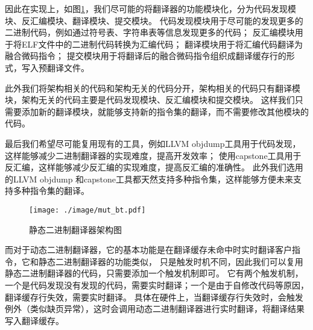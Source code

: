 因此在实现上，如图\ref{img:mut_bt}，我们尽可能的将翻译器的功能模块化，分为代码发现模块、反汇编模块、翻译模块、提交模块。
代码发现模块用于尽可能的发现更多的二进制代码，例如通过符号表、字符串表等信息发现更多的代码；
反汇编模块用于将ELF文件中的二进制代码转换为汇编代码；
翻译模块用于将汇编代码翻译为融合微码指令；
提交模块用于将翻译后的融合微码指令组织成翻译缓存行的形式，写入预翻译文件。

此外我们将架构相关的代码和架构无关的代码分开，架构相关的代码只有翻译模块，架构无关的代码主要是代码发现模块、反汇编模块和提交模块。
这样我们只需要添加新的翻译模块，就能够支持新的指令集的翻译，而不需要修改其他模块的代码。

最后我们希望尽可能复用现有的工具，例如LLVM objdump工具用于代码发现，这样能够减少二进制翻译器的实现难度，提高开发效率；
使用capstone工具用于反汇编，这样能够减少反汇编的实现难度，提高反汇编的准确性。
此外我们选用的LLVM objdump 和capstone工具都天然支持多种指令集，这样能够方便未来支持多种指令集的翻译。



\begin{figure}[!htbp]
  \centering
  \texttt{[image: ./image/mut\_bt.pdf]}
  \caption{静态二进制翻译器架构图}
  \label{img:mut_bt}
\end{figure}

而对于动态二进制翻译器，它的基本功能是在翻译缓存未命中时实时翻译客户指令，它和静态二进制翻译器的功能类似，
只是触发时机不同，因此我们可以复用静态二进制翻译器的代码，只需要添加一个触发机制即可。
它有两个触发机制，一个是代码发现没有发现的代码，需要实时翻译；一个是由于自修改代码等原因，翻译缓存行失效，需要实时翻译。
具体在硬件上，当翻译缓存行失效时，会触发例外（类似缺页异常），这时会调用动态二进制翻译器进行实时翻译，将翻译结果写入翻译缓存。